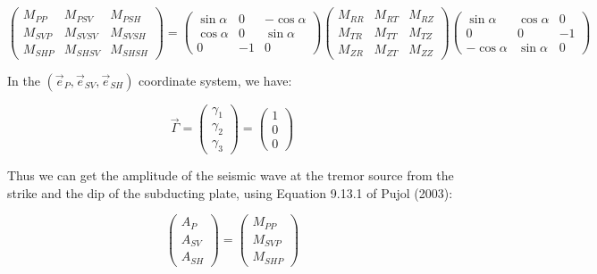 \documentclass[workdone.tex]{subfiles}
\begin{document}
\begin{equation}
\begin{pmatrix}
M_{PP} & M_{PSV} & M_{PSH} \\
M_{SVP} & M_{SVSV} & M_{SVSH} \\
M_{SHP} & M_{SHSV} & M_{SHSH}
\end{pmatrix} = \begin{pmatrix}
\sin \alpha & 0 & - \cos \alpha \\
\cos \alpha & 0 & \sin \alpha \\
0 & - 1 & 0
\end{pmatrix} \begin{pmatrix}
M_{RR} & M_{RT} & M_{RZ} \\
M_{TR} & M_{TT} & M_{TZ} \\
M_{ZR} & M_{ZT} & M_{ZZ}
\end{pmatrix} \begin{pmatrix}
\sin \alpha & \cos \alpha & 0 \\
0 & 0 & - 1 \\
- \cos \alpha & \sin \alpha & 0
\end{pmatrix}
\end{equation}

In the $\left( \vec{e}_P, \vec{e}_{SV}, \vec{e}_{SH} \right)$ coordinate system, we have:

\begin{equation}
\vec{\Gamma} = \begin{pmatrix}
\gamma_1 \\
\gamma_2 \\
\gamma_3
\end{pmatrix} = \begin{pmatrix}
1 \\
0 \\
0
\end{pmatrix}
\end{equation}

Thus we can get the amplitude of the seismic wave at the tremor source from the strike and the dip of the subducting plate, using Equation 9.13.1 of Pujol (2003):

\begin{equation}
\begin{pmatrix}
A_P \\
A_{SV} \\
A_{SH}
\end{pmatrix} =\begin{pmatrix}
M_{PP} \\
M_{SVP} \\
M_{SHP}
\end{pmatrix}
\end{equation}
\end{document}
